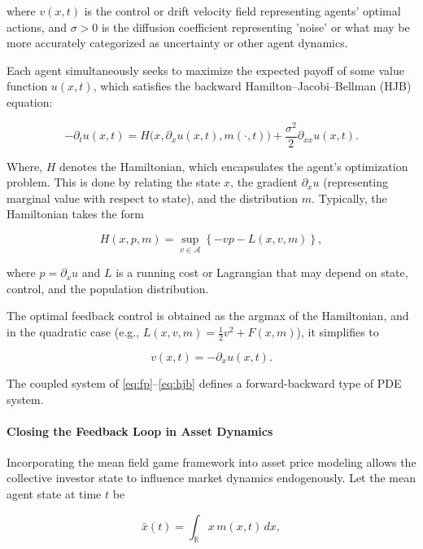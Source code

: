 \documentclass[titlepage]{article}
\begin{document}
where \(v(x,t)\) is the control or drift velocity field representing agents’ optimal actions, and \(\sigma > 0\) is the diffusion coefficient representing 'noise' or what may be more accurately categorized as uncertainty or other agent dynamics.

Each agent simultaneously seeks to maximize the expected payoff of some value function \(u(x,t)\), which satisfies the backward Hamilton–Jacobi–Bellman (HJB) equation:

\begin{equation}
-\partial_t u(x,t) = H\big(x, \partial_x u(x,t), m(\cdot,t)\big) + \frac{\sigma^2}{2} \partial_{xx} u(x,t).
\label{eq:hjb}
\end{equation}

Where, \(H\) denotes the Hamiltonian, which encapsulates the agent’s optimization problem. This is done by relating the state \(x\), the gradient \(\partial_x u\) (representing marginal value with respect to state), and the distribution \(m\). Typically, the Hamiltonian takes the form

\[
H(x, p, m) = \sup_{v \in \mathcal{A}} \left\{ -v p - L(x,v,m) \right\},
\]

where \(p = \partial_x u\) and \(L\) is a running cost or Lagrangian that may depend on state, control, and the population distribution.

The optimal feedback control is obtained as the argmax of the Hamiltonian, and in the quadratic case (e.g., \(L(x,v,m) = \frac{1}{2} v^2 + F(x,m)\)), it simplifies to

\begin{equation}
v(x,t) = -\partial_x u(x,t).
\label{eq:control}
\end{equation}

The coupled system of \eqref{eq:fp}–\eqref{eq:hjb} defines a forward-backward type of PDE system.

\paragraph{Closing the Feedback Loop in Asset Dynamics}

Incorporating the mean field game framework into asset price modeling allows the collective investor state to influence market dynamics endogenously. Let the mean agent state at time \(t\) be

\begin{equation}
\bar{x}(t) = \int_{\mathbb{R}} x \, m(x,t) \, dx,
\label{eq:mean_state}
\end{equation}
\end{document}

